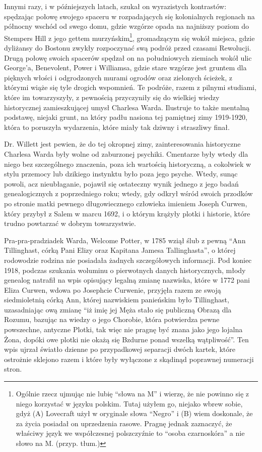 Innymi razy, i w późniejszych latach, szukał on wyrazistych kontrastów: spędzając połowę swojego spaceru w rozpadających się kolonialnych regionach na północny wschód od swego domu, gdzie wzgórze opada na najniższy poziom do Stempers Hill z jego gettem murzyńskim\footnote{Ogólnie rzecz ujmując nie lubię ``słowa na M'' i wierzę, że nie powinno się z niego korzystać w języku polskim. Tutaj użyłem go, niejako wbrew sobie, gdyż (A) Lovecraft użył w oryginale słowa ``Negro'' i (B) wiem doskonale, że za życia posiadał on uprzedzenia rasowe. Pragnę jednak zaznaczyć, że właściwy język we współczesnej polszczyźnie to ``osoba czarnoskóra'' a nie słowo na M. (przyp. tłum.)}, gromadzącym się wokół miejsca, gdzie dyliżansy do Bostonu zwykły rozpoczynać swą podróż przed czasami Rewolucji. Drugą połowę swoich spacerów spędzał on na południowych ziemiach wokół ulic George'a, Benevolent, Power i Williamsa, gdzie stare wzgórze jest gruntem dla pięknych włości i odgrodzonych murami ogrodów oraz zielonych ścieżek, z którymi wiąże się tyle drogich wspomnień. Te podróże, razem z pilnymi studiami, które im towarzyszyły, z pewnością przyczyniły się do wielkiej wiedzy historycznej zamieszkującej umysł Charlesa Warda. Ilustruje to także mentalną podstawę, niejaki grunt, na który padłu nasiona tej pamiętnej zimy 1919-1920, która to poruszyła wydarzenia, które miały tak dziwny i straszliwy finał.

Dr. Willett jest pewien, że do tej okropnej zimy, zainteresowania historyczne Charlesa Warda były wolne od zaburzonej psychiki. Cmentarze były wtedy dla niego bez szczególnego znaczenia, poza ich wartością historyczną, a cokolwiek w stylu przemocy lub dzikiego instynktu było poza jego psyche. Wtedy, sunąc powoli, acz nieubłaganie, pojawił się ostateczny wynik jednego z jego badań genealogicznych z poprzedniego roku; wtedy, gdy odkrył wśród swoich przodków po stronie matki pewnego długowiecznego człowieka imieniem Joseph Curwen, który przybył z Salem w marcu 1692, i o którym krążyły plotki i historie, które trudno powtarzać w dobrym towarzystwie.

Pra-pra-pradziadek Warda, Welcome Potter, w 1785 wziął ślub z pewną ``Ann Tillinghast, córką Pani Elizy oraz Kapitana Jamesa Tallinghasta'', o której rodowodzie rodzina nie posiadała żadnych szczegółowych informacji. Pod koniec 1918, podczas szukania woluminu o pierwotnych danych historycznych, młody genealog natrafił na wpis opisujący legalną zmianę nazwiska, które w 1772 pani Eliza Curwen, wdowa po Josephcie Curwenie, przyjęła razem ze swoją siedmioletnią córką Ann, której nazwiskiem panieńskim było Tillinghast, uzasadniając ową zmianę ``iż imię jej Męża stało się publiczną Obrazą dla Rozumu, bazując na wiedzy o jego Chorobie, która potwierdza pewne powszechne, antyczne Plotki, tak więc nie pragnę być znana jako jego lojalna Żona, dopóki owe plotki nie okażą się Bzdurne ponad wszelką wątpliwość''. Ten wpis ujrzał światło dzienne po przypadkowej separacji dwóch kartek, które ostrożnie sklejono razem i które były wyłączone z skądinąd poprawnej numeracji stron.

